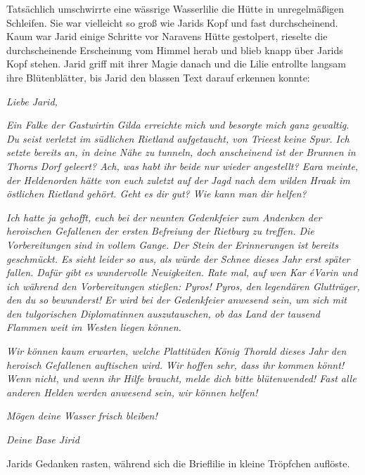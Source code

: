 Tatsächlich umschwirrte eine wässrige Wasserlilie die Hütte in unregelmäßigen Schleifen. Sie war vielleicht so groß wie Jarids Kopf und fast durchscheinend. Kaum war Jarid einige Schritte vor Naravens Hütte gestolpert, rieselte die durchscheinende Erscheinung vom Himmel herab und blieb knapp über Jarids Kopf stehen. Jarid griff mit ihrer Magie danach und die Lilie entrollte langsam ihre Blütenblätter, bis Jarid den blassen Text darauf erkennen konnte:\bigskip



\textit{Liebe Jarid,}



\textit{Ein Falke der Gastwirtin Gilda erreichte mich und besorgte mich ganz gewaltig. Du seist verletzt im südlichen Rietland aufgetaucht, von Trieest keine Spur. Ich setzte bereits an, in deine Nähe zu tunneln, doch anscheinend ist der Brunnen in Thorns Dorf geleert? Ach, was habt ihr beide nur wieder angestellt? Eara meinte, der Heldenorden hätte von euch zuletzt auf der Jagd nach dem wilden Hraak im östlichen Rietland gehört. Geht es dir gut? Wie kann man dir helfen?}

\textit{Ich hatte ja gehofft, euch bei der neunten Gedenkfeier zum Andenken der heroischen Gefallenen der ersten Befreiung der Rietburg zu treffen. Die Vorbereitungen sind in vollem Gange. Der Stein der Erinnerungen ist bereits geschmückt. Es sieht leider so aus, als würde der Schnee dieses Jahr erst später fallen. Dafür gibt es wundervolle Neuigkeiten. Rate mal, auf wen Kar éVarin und ich während den Vorbereitungen stießen: Pyros! Pyros, den legendären Glutträger, den du so bewunderst! Er wird bei der Gedenkfeier anwesend sein, um sich mit den tulgorischen Diplomatinnen auszutauschen, ob das Land der tausend Flammen weit im Westen liegen können.}

\textit{Wir können kaum erwarten, welche Plattitüden König Thorald dieses Jahr den heroisch Gefallenen auftischen wird. Wir hoffen sehr, dass ihr kommen könnt! Wenn nicht, und wenn ihr Hilfe braucht, melde dich bitte blütenwended! Fast alle anderen Helden werden anwesend sein, wir können helfen!}



\textit{Mögen deine Wasser frisch bleiben!}

\textit{Deine Base Jirid}\bigskip



Jarids Gedanken rasten, während sich die Brieflilie in kleine Tröpfchen auflöste.


